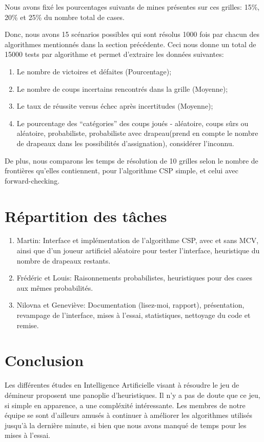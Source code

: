 \documentclass{article}
\begin{document}
Nous avons fixé les pourcentages suivants de mines présentes sur ces grilles: 15\%, 20\% et 25\% du nombre total de cases.

Donc, nous avons 15 scénarios possibles qui sont résolus 1000 fois par chacun des 
algorithmes mentionnés dans la section précédente. Ceci nous donne un total de 15000 
tests par algorithme et permet d’extraire les données suivantes: 

\begin{enumerate}
        \item Le nombre de victoires et défaites (Pourcentage);
        \item Le nombre de coups incertains rencontrés dans la grille (Moyenne);
        \item Le taux de réussite versus échec après incertitudes (Moyenne);
        \item Le pourcentage des “catégories” des coups joués - aléatoire, coups 
              sûrs ou aléatoire, probabiliste, probabiliste avec drapeau(prend en 
              compte le nombre de drapeaux dans les possibilités d’assignation), 
              considérer l’inconnu.
\end{enumerate}

De plus, nous comparons les temps de résolution de 10 grilles selon le nombre de 
frontières qu’elles contiennent, pour l’algorithme CSP simple, et celui avec forward-checking.

\section{Répartition des tâches}
\begin{enumerate}
        \item Martin: Interface et implémentation de l’algorithme CSP, avec et sans 
              MCV, ainsi que d’un joueur artificiel aléatoire pour tester 
              l’interface, heuristique du nombre de drapeaux restants.
        \item Frédéric et Louis: Raisonnements probabilistes, heuristiques pour des cases aux mêmes probabilités.
        \item Nilovna et Geneviève: Documentation (lisez-moi, rapport), présentation, 
              revampage de l’interface, mises à l’essai, statistiques, nettoyage du code et remise.
\end{enumerate}

\section{Conclusion}
Les différentes études en Intelligence Artificielle visant à résoudre le jeu de démineur proposent une panoplie d’heuristiques. Il n’y a pas de doute que ce jeu, si simple en apparence, a une compléxité intéressante. Les membres de notre équipe se sont d’ailleurs amusés à continuer à améliorer les algorithmes utilisés jusqu’à la dernière minute, si bien que nous avons manqué de temps pour les mises à l’essai. 
\end{document}
